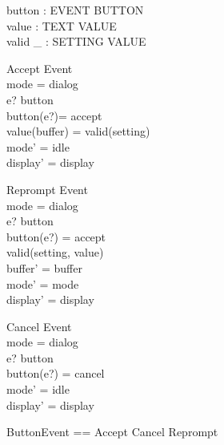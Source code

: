 \documentclass{llncs}
\begin{document}
\begin{axdef}
button : EVENT \pfun BUTTON \\
value : TEXT \fun VALUE \\
valid \_ : SETTING \rel VALUE
\end{axdef}
\begin{schema}{Accept}
Event \\
\where mode = dialog \\
e? \in \dom button \\
button(e?)= accept \\
value(buffer) = valid(setting)\\
mode' = idle \\
display' = display
\end{schema}
\begin{schema}{Reprompt}
Event \\
\where mode = dialog \\
e? \in \dom button \\
button(e?) = accept \\
\lnot valid(setting, value)\\
buffer' = buffer \\
mode' = mode \\
display' = display
\end{schema}
\begin{schema}{Cancel}
Event \\
\where mode = dialog \\
e? \in \dom button \\
button(e?) = cancel \\
mode' = idle \\
display' = display
\end{schema}
\begin{zed}
ButtonEvent == Accept \lor Cancel \lor Reprompt
\end{zed}
\end{document}
